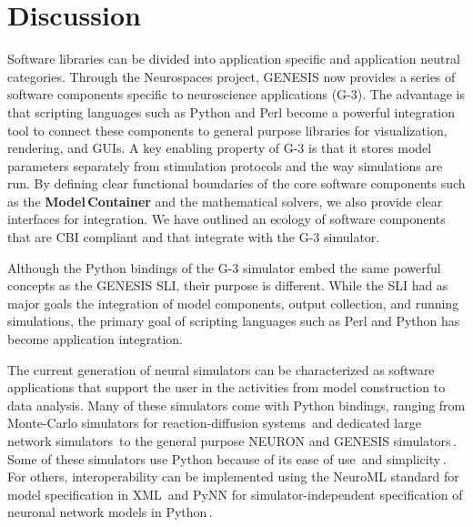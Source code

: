 \documentclass[12pt]{article}
\begin{document}



\section{Discussion}


Software libraries can be divided into application specific and
application neutral categories.  Through the Neurospaces project,
GENESIS now provides a series of software components specific to
neuroscience applications (G-3).  The advantage is that scripting
languages such as Python and Perl become a powerful integration tool
to connect these components to general purpose libraries for
visualization, rendering, and GUIs.  A key enabling property of G-3 is
that it stores model parameters separately from stimulation protocols
and the way simulations are run.  By defining clear functional
boundaries of the core software components such as the {\bf
  Model\,Container} and the mathematical solvers, we also provide
clear interfaces for integration. We have outlined an ecology of
software components that are CBI compliant and that integrate with the
G-3 simulator.

Although the Python bindings of the G-3 simulator embed the same
powerful concepts as the GENESIS SLI, their purpose is different.
While the SLI had as major goals the integration of model components,
output collection, and running simulations, the primary goal of
scripting languages such as Perl and Python has become application
integration.

The current generation of neural simulators can be characterized as software
applications that support the user in the activities from model
construction to data analysis.  Many of these simulators come with
Python bindings, ranging from Monte-Carlo simulators for
reaction-diffusion systems\,\cite{wils09:_steps} and dedicated large
network simulators\,\cite{eppler08:_pynes} to the general purpose NEURON
and GENESIS
simulators\,\cite{hines09:_neuron_python, bower98:_book_genes}.
Some of these simulators use Python because of its ease of
use\,\cite{pecevski09:_pcsim} and simplicity\,\cite{goodman08:_brian}.
For others, interoperability can be implemented using the
NeuroML standard for model specification in
XML\,\cite{nigel01:_towar_neurom} and PyNN for simulator-independent
specification of neuronal network models in
Python\,\cite{andrew08:_pynn}.
\end{document}
